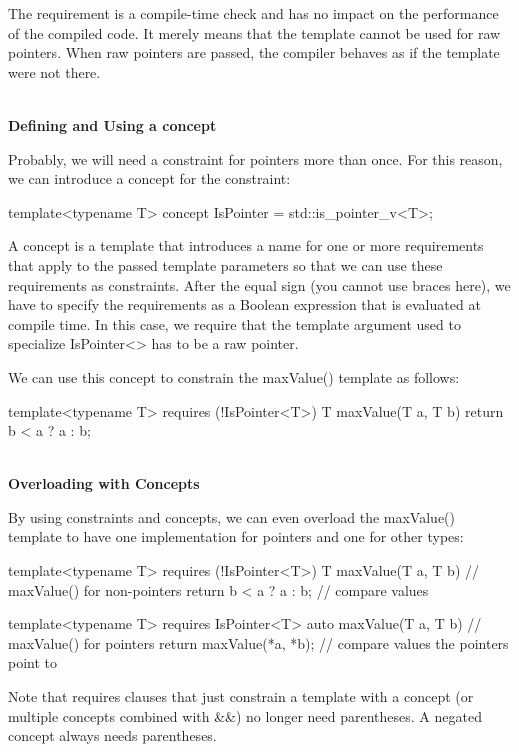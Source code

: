 The requirement is a compile-time check and has no impact on the performance of the compiled code. It merely means that the template cannot be used for raw pointers. When raw pointers are passed, the compiler behaves as if the template were not there.

\noindent
\hspace*{\fill} \\ %
\textbf{Defining and Using a concept}

Probably, we will need a constraint for pointers more than once. For this reason, we can introduce a concept for the constraint:

\begin{cpp}
template<typename T>
concept IsPointer = std::is_pointer_v<T>;
\end{cpp}

A concept is a template that introduces a name for one or more requirements that apply to the passed template parameters so that we can use these requirements as constraints. After the equal sign (you cannot use braces here), we have to specify the requirements as a Boolean expression that is evaluated at compile time. In this case, we require that the template argument used to specialize IsPointer<> has to be a raw pointer.

We can use this concept to constrain the maxValue() template as follows:

\begin{cpp}
template<typename T>
requires (!IsPointer<T>)
T maxValue(T a, T b)
{
	return b < a ? a : b;
}
\end{cpp}

\noindent
\hspace*{\fill} \\ %
\textbf{Overloading with Concepts}

By using constraints and concepts, we can even overload the maxValue() template to have one implementation for pointers and one for other types:

\begin{cpp}
template<typename T>
requires (!IsPointer<T>)
T maxValue(T a, T b) // maxValue() for non-pointers
{
	return b < a ? a : b; // compare values
}

template<typename T>
requires IsPointer<T>
auto maxValue(T a, T b) // maxValue() for pointers
{
	return maxValue(*a, *b); // compare values the pointers point to
}
\end{cpp}

Note that requires clauses that just constrain a template with a concept (or multiple concepts combined with \&\&) no longer need parentheses. A negated concept always needs parentheses.

